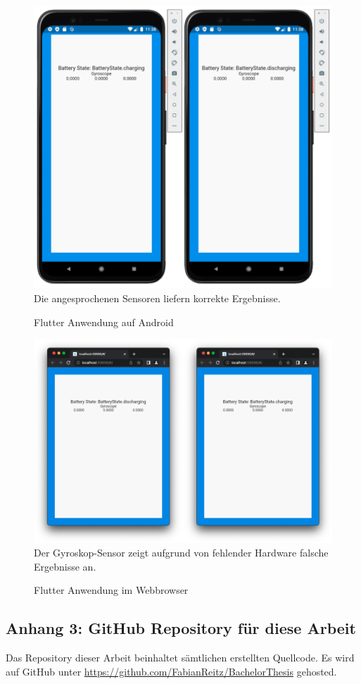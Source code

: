 \documentclass[a4paper]{scrartcl}
\begin{document}
\begin{figure}[H]
	\centering
	\caption{Flutter Anwendung auf Android}
	\includegraphics[scale=0.35]{_assets/Android_Flutter.png} \\
	Die angesprochenen Sensoren liefern korrekte Ergebnisse.
\end{figure}

\begin{figure}[H]
	\centering
	\caption{Flutter Anwendung im Webbrowser}
	\includegraphics[scale=0.25]{_assets/WebApp_Flutter.png} \\
	Der Gyroskop-Sensor zeigt aufgrund von fehlender Hardware falsche Ergebnisse an.
\end{figure}

\subsection*{Anhang 3: GitHub Repository für diese Arbeit}

Das Repository dieser Arbeit beinhaltet sämtlichen erstellten Quellcode. Es wird auf GitHub unter \url{https://github.com/FabianReitz/BachelorThesis} gehosted.
\end{document}
